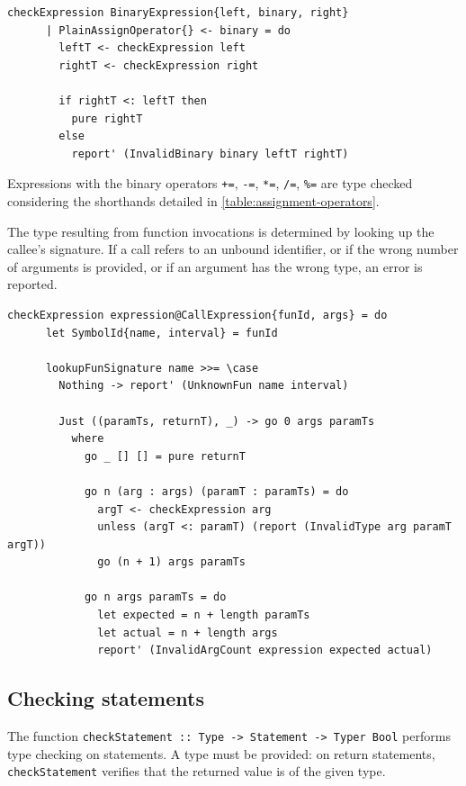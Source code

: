 \documentclass[UdineBachThesis,american,11pt]{PhdThesis}
\begin{document}
  \begin{Verbatim}[gobble=4,fontsize=\small]
    checkExpression BinaryExpression{left, binary, right}
      | PlainAssignOperator{} <- binary = do
        leftT <- checkExpression left
        rightT <- checkExpression right

        if rightT <: leftT then
          pure rightT
        else
          report' (InvalidBinary binary leftT rightT)
  \end{Verbatim}

  Expressions with the binary operators \mbox{\texttt{+=}}, \mbox{\texttt{-=}},
  \mbox{\texttt{*=}}, \mbox{\texttt{/=}}, \mbox{\texttt{\%=}} are type checked
  considering the shorthands detailed in \autoref{table:assignment-operators}.

  The type resulting from function invocations is determined by looking up the
  callee's signature. If a call refers to an unbound identifier, or if the wrong
  number of arguments is provided, or if an argument has the wrong type, an
  error is reported.

  \begin{Verbatim}[gobble=4,fontsize=\small]
    checkExpression expression@CallExpression{funId, args} = do
      let SymbolId{name, interval} = funId

      lookupFunSignature name >>= \case
        Nothing -> report' (UnknownFun name interval)

        Just ((paramTs, returnT), _) -> go 0 args paramTs
          where
            go _ [] [] = pure returnT

            go n (arg : args) (paramT : paramTs) = do
              argT <- checkExpression arg
              unless (argT <: paramT) (report (InvalidType arg paramT argT))
              go (n + 1) args paramTs

            go n args paramTs = do
              let expected = n + length paramTs
              let actual = n + length args
              report' (InvalidArgCount expression expected actual)
  \end{Verbatim}

  \subsection{Checking statements}

  The function \mbox{\texttt{checkStatement :: Type -> Statement -> Typer Bool}}
  performs type checking on statements. A type must be provided: on return
  statements, \mbox{\texttt{checkStatement}} verifies that the returned value is
  of the given type.
\end{document}
